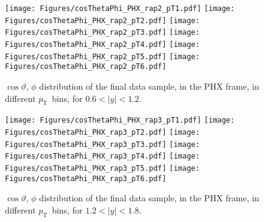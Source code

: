 \documentclass[12pt]{article}
\newcommand{\pt}{$p_{\mathrm{T}}$}
\begin{document}
\begin{figure}[htbp]
\centering
\texttt{[image: Figures/cosThetaPhi\_PHX\_rap2\_pT1.pdf]}
\texttt{[image: Figures/cosThetaPhi\_PHX\_rap2\_pT2.pdf]}
\texttt{[image: Figures/cosThetaPhi\_PHX\_rap2\_pT3.pdf]}
\texttt{[image: Figures/cosThetaPhi\_PHX\_rap2\_pT4.pdf]}
\texttt{[image: Figures/cosThetaPhi\_PHX\_rap2\_pT5.pdf]}
\texttt{[image: Figures/cosThetaPhi\_PHX\_rap2\_pT6.pdf]}
\caption{$\cos\vartheta,\,\phi$ distribution of the final data sample, 
	in the PHX frame, in different \pt\ bins, for $0.6 < |y| < 1.2$.}
\end{figure}
\clearpage

\begin{figure}[htbp]
\centering
\texttt{[image: Figures/cosThetaPhi\_PHX\_rap3\_pT1.pdf]}
\texttt{[image: Figures/cosThetaPhi\_PHX\_rap3\_pT2.pdf]}
\texttt{[image: Figures/cosThetaPhi\_PHX\_rap3\_pT3.pdf]}
\texttt{[image: Figures/cosThetaPhi\_PHX\_rap3\_pT4.pdf]}
\texttt{[image: Figures/cosThetaPhi\_PHX\_rap3\_pT5.pdf]}
\texttt{[image: Figures/cosThetaPhi\_PHX\_rap3\_pT6.pdf]}
\caption{$\cos\vartheta,\,\phi$ distribution of the final data sample, 
	in the PHX frame, in different \pt\ bins, for $1.2 < |y| < 1.8$.}
\end{figure}
\clearpage
\end{document}
